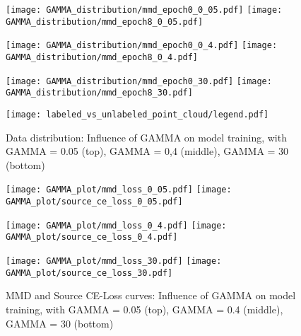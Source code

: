 \begin{figure}[H]
  \centering
  \texttt{[image: GAMMA\_distribution/mmd\_epoch0\_0\_05.pdf]}
  \hspace{.3cm}
  \texttt{[image: GAMMA\_distribution/mmd\_epoch8\_0\_05.pdf]}

  \vspace{.1cm}

  \texttt{[image: GAMMA\_distribution/mmd\_epoch0\_0\_4.pdf]}
  \hspace{.3cm}
  \texttt{[image: GAMMA\_distribution/mmd\_epoch8\_0\_4.pdf]}

  \vspace{.1cm}

  \texttt{[image: GAMMA\_distribution/mmd\_epoch0\_30.pdf]}
  \hspace{.3cm}
  \texttt{[image: GAMMA\_distribution/mmd\_epoch8\_30.pdf]}
  
  \vspace{.1cm}
  
  \texttt{[image: labeled\_vs\_unlabeled\_point\_cloud/legend.pdf]}


  \caption{Data distribution: Influence of GAMMA on model training, with GAMMA = 0.05 (top), GAMMA = 0,4 (middle), GAMMA = 30 (bottom)}
  \label{fig:point_cloud_mmd}
\end{figure}





\begin{figure}[H]
  \centering
  \texttt{[image: GAMMA\_plot/mmd\_loss\_0\_05.pdf]}
  \hspace{.3cm}
  \texttt{[image: GAMMA\_plot/source\_ce\_loss\_0\_05.pdf]}

  \vspace{.3cm}

  \texttt{[image: GAMMA\_plot/mmd\_loss\_0\_4.pdf]}
  \hspace{.3cm}
  \texttt{[image: GAMMA\_plot/source\_ce\_loss\_0\_4.pdf]}

  \vspace{.3cm}

  \texttt{[image: GAMMA\_plot/mmd\_loss\_30.pdf]}
  \hspace{.3cm}
  \texttt{[image: GAMMA\_plot/source\_ce\_loss\_30.pdf]}

  \caption{MMD and Source CE-Loss curves: Influence of GAMMA on model training, with GAMMA = 0.05 (top), GAMMA = 0.4 (middle), GAMMA = 30 (bottom)}
  \label{fig:learning_curves_influence_mmd_feature_extractor}
\end{figure}

